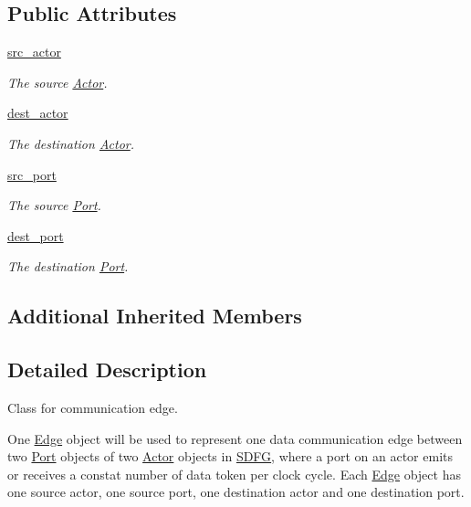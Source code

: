 \subsection*{Public Attributes}
\begin{DoxyCompactItemize}
\item 
\hyperlink{classsylva_1_1base_1_1sdf_1_1_edge_a669757129f2efcb76625f90992afd7db}{src\+\_\+actor}
\begin{DoxyCompactList}\small\item\em The source \hyperlink{classsylva_1_1base_1_1sdf_1_1_actor}{Actor}. \end{DoxyCompactList}\item 
\hyperlink{classsylva_1_1base_1_1sdf_1_1_edge_aaf76b434868a8237cd832dbd0a3a20f1}{dest\+\_\+actor}
\begin{DoxyCompactList}\small\item\em The destination \hyperlink{classsylva_1_1base_1_1sdf_1_1_actor}{Actor}. \end{DoxyCompactList}\item 
\hyperlink{classsylva_1_1base_1_1sdf_1_1_edge_a824af9d2da5c0fadcc08bba783a29f15}{src\+\_\+port}
\begin{DoxyCompactList}\small\item\em The source \hyperlink{classsylva_1_1base_1_1sdf_1_1_port}{Port}. \end{DoxyCompactList}\item 
\hyperlink{classsylva_1_1base_1_1sdf_1_1_edge_a9c5834c5e8234311f49654ced9c43424}{dest\+\_\+port}
\begin{DoxyCompactList}\small\item\em The destination \hyperlink{classsylva_1_1base_1_1sdf_1_1_port}{Port}. \end{DoxyCompactList}\end{DoxyCompactItemize}
\subsection*{Additional Inherited Members}


\subsection{Detailed Description}
Class for communication edge. 

One \hyperlink{classsylva_1_1base_1_1sdf_1_1_edge}{Edge} object will be used to represent one data communication edge between two \hyperlink{classsylva_1_1base_1_1sdf_1_1_port}{Port} objects of two \hyperlink{classsylva_1_1base_1_1sdf_1_1_actor}{Actor} objects in \hyperlink{classsylva_1_1base_1_1sdf_1_1_s_d_f_g}{S\+D\+FG}, where a port on an actor emits or receives a constat number of data token per clock cycle. Each \hyperlink{classsylva_1_1base_1_1sdf_1_1_edge}{Edge} object has one source actor, one source port, one destination actor and one destination port. 

